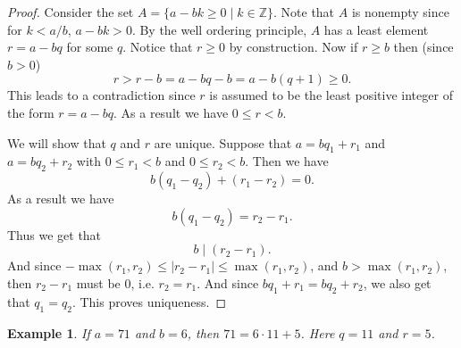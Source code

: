 \documentclass[12pt,letterpaper]{book}
\newtheorem{example}{Example}
\begin{document}
\begin{proof}
Consider the set $A=\{a-bk\geq 0 \mid k\in \mathbb{Z}\}$.  Note that
$A$ is nonempty since for $k<a/b$, $a-bk>0$.  By the well ordering
principle, $A$ has a least element $r=a-bq$ for some $q$. Notice
that $r\geq 0$ by construction.  Now if  $r\geq b$ then (since
$b>0$)
\begin{equation*}
r>r-b=a-bq-b=a-b(q+1)\geq 0.
\end{equation*}
This leads to a contradiction since $r$ is assumed to be the least
positive integer of the form $r=a-bq$.  As a result we have $0\leq r
<b$.
\par We will show that $q$ and $r$ are unique.  Suppose
that $a=bq_1+r_1$ and\\ $a=bq_2+r_2$ with $0\leq r_1<b$ and $0\leq
r_2<b$.  Then we have
\begin{equation*}
b(q_1-q_2)+(r_1-r_2)=0.
\end{equation*}
As a result we have
\begin{equation*}
b(q_1-q_2)=r_2-r_1.
\end{equation*}
Thus we get that
\begin{equation*}
b\mid (r_2-r_1).
\end{equation*}
And since $-\max(r_1,r_2)\leq|r_2-r_1|\leq\max(r_1,r_2)$, and $b>\max(r_1,r_2)$,
then $r_2-r_1$ must be $0$, i.e. $r_2=r_1$. And since
$bq_1+r_1=bq_2+r_2$, we also get that $q_1=q_2$. This proves uniqueness.
\end{proof}

\begin{example}
If $a=71$ and $b=6$, then $71=6\cdot 11+5$.  Here $q=11$ and $r=5$.
\end{example}
\end{document}
